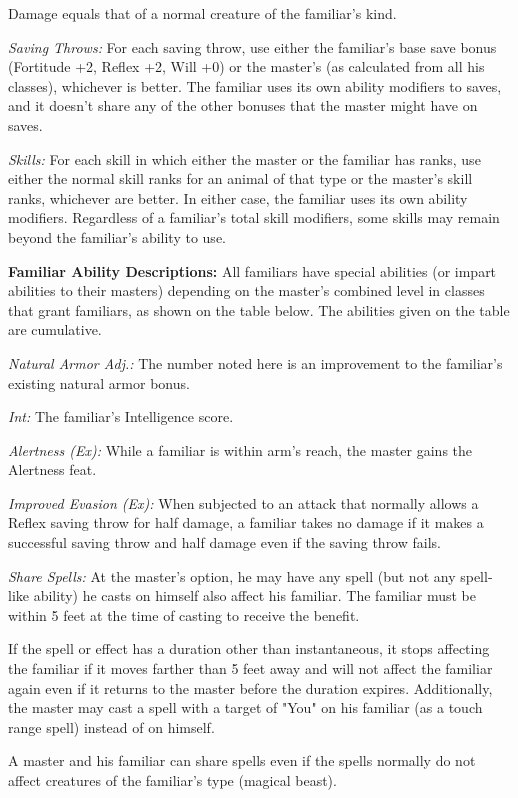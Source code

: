 Damage equals that of a normal creature of the familiar's kind.

\textit{Saving Throws:} For each saving throw, use either the familiar's base save 
bonus (Fortitude +2, Reflex +2, Will +0) or the master's (as calculated from all 
his classes), whichever is better. The familiar uses its own ability modifiers 
to saves, and it doesn't share any of the other bonuses that the master might have 
on saves.

\textit{Skills:} For each skill in which either the master or the familiar has 
ranks, use either the normal skill ranks for an animal of that type or the master's 
skill ranks, whichever are better. In either case, the familiar uses its own ability 
modifiers. Regardless of a familiar's total skill modifiers, some skills may remain 
beyond the familiar's ability to use.

\textbf{Familiar Ability Descriptions:} All familiars have special abilities (or 
impart abilities to their masters) depending on the master's combined level in 
classes that grant familiars, as shown on the table below. The abilities given 
on the table are cumulative. 

\textit{Natural Armor Adj.:} The number noted here is an improvement to the familiar's 
existing natural armor bonus.

\textit{Int:} The familiar's Intelligence score.

\textit{Alertness (Ex):} While a familiar is within arm's reach, the master gains 
the Alertness feat.

\textit{Improved Evasion (Ex):} When subjected to an attack that normally allows 
a Reflex saving throw for half damage, a familiar takes no damage if it makes a 
successful saving throw and half damage even if the saving throw fails.

\textit{Share Spells:} At the master's option, he may have any spell (but not any 
spell-like ability) he casts on himself also affect his familiar. The familiar 
must be within 5 feet at the time of casting to receive the benefit.

If the spell or effect has a duration other than instantaneous, it stops affecting 
the familiar if it moves farther than 5 feet away and will not affect the familiar 
again even if it returns to the master before the duration expires. Additionally, 
the master may cast a spell with a target of "You" on his familiar (as a touch 
range spell) instead of on himself.

A master and his familiar can share spells even if the spells normally do not affect 
creatures of the familiar's type (magical beast).

